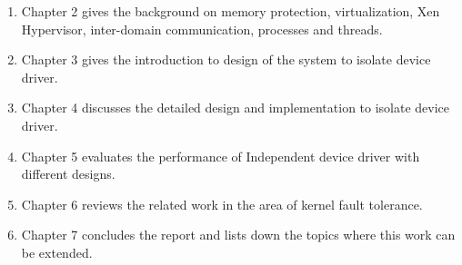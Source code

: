 \begin{enumerate}
\item Chapter 2 gives the background on memory protection, virtualization, Xen Hypervisor, inter-domain communication, processes and threads. 
\item Chapter 3 gives the introduction to design of the system to isolate device driver. 
\item Chapter 4 discusses the detailed design and implementation to isolate device driver. 
\item Chapter 5 evaluates the performance of Independent device driver with different designs.
\item Chapter 6 reviews the related work in the area of kernel fault tolerance.
\item Chapter 7 concludes the report and lists down the topics where this work can be extended.
\end{enumerate}

